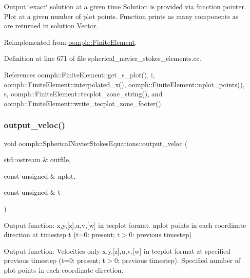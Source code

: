 Output \char`\"{}exact\char`\"{} solution at a given time Solution is provided via function pointer. Plot at a given number of plot points. Function prints as many components as are returned in solution \hyperlink{classoomph_1_1Vector}{Vector}. 

Reimplemented from \hyperlink{classoomph_1_1FiniteElement_a2a8426dccd57b927be0ae0eec00d0479}{oomph\+::\+Finite\+Element}.



Definition at line 671 of file spherical\+\_\+navier\+\_\+stokes\+\_\+elements.\+cc.



References oomph\+::\+Finite\+Element\+::get\+\_\+s\+\_\+plot(), i, oomph\+::\+Finite\+Element\+::interpolated\+\_\+x(), oomph\+::\+Finite\+Element\+::nplot\+\_\+points(), s, oomph\+::\+Finite\+Element\+::tecplot\+\_\+zone\+\_\+string(), and oomph\+::\+Finite\+Element\+::write\+\_\+tecplot\+\_\+zone\+\_\+footer().

\mbox{\label{classoomph_1_1SphericalNavierStokesEquations_ae9b06a27652654ad42dc9882399e9374}} 
\subsubsection{\texorpdfstring{output\+\_\+veloc()}{output\_veloc()}}
{\footnotesize\ttfamily void oomph\+::\+Spherical\+Navier\+Stokes\+Equations\+::output\+\_\+veloc (\begin{DoxyParamCaption}\item[{std\+::ostream \&}]{outfile,  }\item[{const unsigned \&}]{nplot,  }\item[{const unsigned \&}]{t }\end{DoxyParamCaption})}



Output function\+: x,y,\mbox{[}z\mbox{]},u,v,\mbox{[}w\mbox{]} in tecplot format. nplot points in each coordinate direction at timestep t (t=0\+: present; t$>$0\+: previous timestep) 

Output function\+: Velocities only x,y,\mbox{[}z\mbox{]},u,v,\mbox{[}w\mbox{]} in tecplot format at specified previous timestep (t=0\+: present; t$>$0\+: previous timestep). Specified number of plot points in each coordinate direction. 

